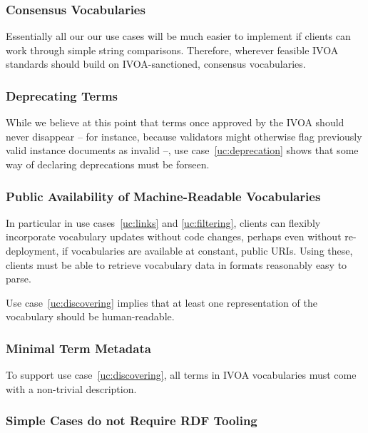 \documentclass[11pt,a4paper]{ivoa}
\begin{document}
\subsubsection{Consensus Vocabularies}
\label{req:consensus}

Essentially all our our use cases will be much easier to implement if
clients can work through simple string comparisons.  Therefore,
wherever feasible IVOA standards should build on IVOA-sanctioned,
consensus vocabularies.

\subsubsection{Deprecating Terms}
\label{req:deprecating}

While we believe at this point that terms once approved by the IVOA
should never disappear -- for instance, because validators might
otherwise flag previously valid instance documents as invalid --, use
case~\ref{uc:deprecation} shows that some way of declaring
deprecations must be forseen.

\subsubsection{Public Availability of Machine-Readable Vocabularies}
\label{req:machine}

In particular in use cases~\ref{uc:links} and \ref{uc:filtering},
clients can flexibly incorporate vocabulary updates without code
changes, perhaps even without re-deployment, if vocabularies are
available at constant, public URIs.  Using these, clients must be able to 
retrieve vocabulary data in formats reasonably easy to parse.

Use case~\ref{uc:discovering} implies that at least one representation
of the vocabulary should be human-readable.

\subsubsection{Minimal Term Metadata}
\label{req:mtm}

To support use case~\ref{uc:discovering}, all terms in IVOA vocabularies
must come with a non-trivial description.

\subsubsection{Simple Cases do not Require RDF Tooling}
\label{req:nordf}
\end{document}

